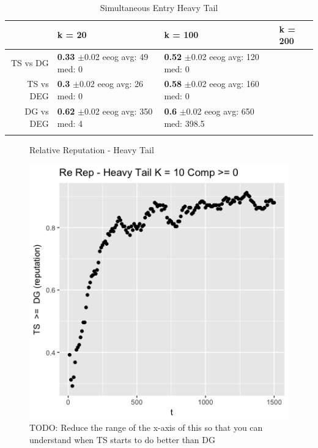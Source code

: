 \documentclass{article}
\theoremstyle{definition}
\begin{document}
\begin{table}[ht]
\centering
\caption{Simultaneous Entry Heavy Tail} 
\begin{tabular}{rlll}
  \hline
 & k = 20 & k = 100 & k = 200 \\ 
  \hline
TS vs DG & \makecell{\textbf{0.33} $\pm$0.02\\ eeog \\ avg: 49\\ med: 0} & \makecell{\textbf{0.52} $\pm$0.02\\ eeog \\ avg: 120\\ med: 0} &  \\ 
  TS vs DEG & \makecell{\textbf{0.3} $\pm$0.02\\ eeog \\ avg: 26\\ med: 0} & \makecell{\textbf{0.58} $\pm$0.02\\ eeog \\ avg: 160\\ med: 0} &  \\ 
  DG vs DEG & \makecell{\textbf{0.62} $\pm$0.02\\ eeog \\ avg: 350\\ med: 4} & \makecell{\textbf{0.6} $\pm$0.02\\ eeog \\ avg: 650\\ med: 398.5} &  \\ 
   \hline
   \label{hm_ht}
\end{tabular}
\end{table}

\begin{figure}
\label{rel_rep_ht_fine}
\caption{Relative Reputation - Heavy Tail}
\includegraphics[scale=0.3]{figures/ts_dg_heavy_fine}
\caption*{TODO: Reduce the range of the x-axis of this so that you can understand when TS starts to do better than DG}
\end{figure}
\end{document}
